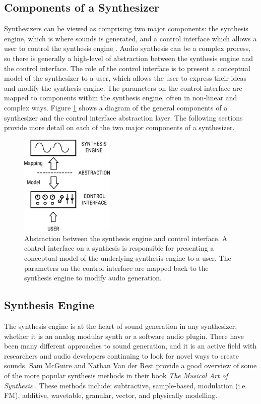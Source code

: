 \subsection{Components of a Synthesizer}
Synthesizers can be viewed as comprising two major components: the synthesis engine, which is where sounds is generated, and a control interface which allows a user to control the synthesis engine \cite{russ2012sound}. Audio synthesis can be a complex process, so there is generally a high-level of abstraction between the synthesis engine and the control interface. The role of the control interface is to present a conceptual model of the synthesizer to a user, which allows the user to express their ideas and modify the synthesis engine. The parameters on the control interface are mapped to components within the synthesis engine, often in non-linear and complex ways. Figure \ref{fig:synth_abstraction} shows a diagram of the general components of a synthesizer and the control interface abstraction layer. The following sections provide more detail on each of the two major components of a synthesizer.

\begin{figure}[ht]
    \centering
    \includegraphics[width=0.4\textwidth]{figures/background/Synth Abstraction Model.pdf}
    \caption{Abstraction between the synthesis engine and control interface. A control interface on a synthesis is responsible for presenting a conceptual model of the underlying synthesis engine to a user. The parameters on the control interface are mapped back to the synthesis engine to modify audio generation.}
    \label{fig:synth_abstraction}
\end{figure}

\subsection{Synthesis Engine}
The synthesis engine is at the heart of sound generation in any synthesizer, whether it is an analog modular synth or a software audio plugin. There have been many different approaches to sound generation, and it is an active field with researchers and audio developers continuing to look for novel ways to create sounds. Sam McGuire and Nathan Van der Rest provide a good overview of some of the more popular synthesis methods in their book \textit{The Musical Art of Synthesis} \cite{mcguire2015musical}. These methods include: subtractive, sample-based, modulation (i.e. FM), additive, wavetable, granular, vector, and physically modelling. 

